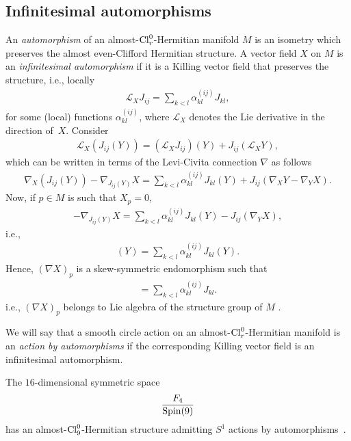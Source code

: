 \documentclass[10pt,a4paper]{amsart}
\numberwithin{equation}{section}
\begin{document}
\subsection{Inf\/initesimal automorphisms}\label{subsec: infinitesimal automorphism}
An {\em automorphism} of an almost-${\rm Cl}_r^0$-Hermitian manifold $M$ is an isometry which preserves the almost even-Clif\/ford Hermitian structure. A vector f\/ield $X$ on $M$ is an {\em infinitesimal automorphism} if it is a Killing vector f\/ield that preserves the structure, i.e., locally
\begin{gather*}\mathcal{L}_X J_{ij} =\sum_{k<l} \alpha_{kl}^{(ij)} J_{kl},\end{gather*}
for some (local) functions $\alpha_{kl}^{(ij)}$, where $\mathcal{L}_X$ denotes the Lie derivative in the direction of~$X$. Consider
\begin{gather*}
{\mathcal L}_X(J_{ij}(Y)) = ({\mathcal L}_XJ_{ij})(Y) + J_{ij}({\mathcal L}_XY),
\end{gather*}
which can be written in terms of the Levi-Civita connection $\nabla$ as follows
\begin{gather*}
\nabla_X(J_{ij}(Y))-\nabla_{J_{ij}(Y)}X = \sum_{k<l} \alpha_{kl}^{(ij)} J_{kl}(Y)+J_{ij}(\nabla_XY-\nabla_YX).
\end{gather*}
Now, if $p\in M$ is such that $X_p=0$,
\begin{gather*}
-\nabla_{J_{ij}(Y)}X = \sum_{k<l} \alpha_{kl}^{(ij)} J_{kl}(Y)-J_{ij}(\nabla_YX),
\end{gather*}
i.e.,
\begin{gather*}
[J_{ij},\nabla X](Y) = \sum_{k<l} \alpha_{kl}^{(ij)} J_{kl}(Y).
\end{gather*}
Hence, $(\nabla X)_p$ is a skew-symmetric endomorphism such that
\begin{gather*}
[J_{ij},\nabla X] = \sum_{k<l} \alpha_{kl}^{(ij)} J_{kl}.
\end{gather*}
i.e., $(\nabla X)_p$ belongs to Lie algebra of the structure group of $M$ \cite{Arizmendi-Garcia-Herrera, Arizmendi-Herrera}.

We will say that a smooth circle action on an almost-${\rm Cl}_r^0$-Hermitian manifold is an {\em action by automorphisms} if the corresponding Killing vector f\/ield is an inf\/initesimal automorphism.

\begin{Example}
The $16$-dimensional symmetric space
\begin{gather*}{F_4\over {\rm Spin}(9)}\end{gather*}
has an almost-${\rm Cl}_9^0$-Hermitian structure admitting $S^1$ actions by automorphisms~\cite{Friedrich-weak}.
\end{Example}
\end{document}
